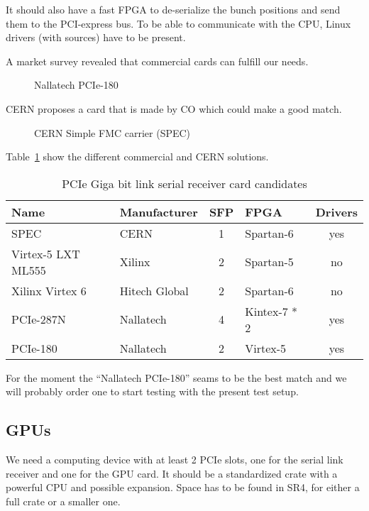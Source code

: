 It should also have a fast FPGA to de-serialize the bunch positions and send them to the PCI-express bus. To be able to communicate with the CPU, Linux drivers (with sources) have to be present.

A market survey revealed that commercial cards can fulfill our needs.

\begin{figure}[H]
\caption{Nallatech PCIe-180}
\label{fig:nallatech}
\centering
\end{figure}

\gls{CERN} proposes a card that is made by \gls{CO} which could make a good match.

\begin{figure}[H]
\caption{CERN Simple FMC carrier (SPEC)}
\label{fig:spec}
\centering
\end{figure}

Table~\ref{tab:receiver_cards} show the different commercial and CERN solutions.

\begin{table}[H]
\caption{PCIe Giga bit link serial receiver card candidates}
\label{tab:receiver_cards}
\centering
\begin{tabular}{|ll|c|l|c|}
\hline
Name & Manufacturer & SFP & FPGA & Drivers \\
\hline
\hline
SPEC & CERN & 1 & Spartan-6 & yes \\
\hline
Virtex-5 LXT ML555 & Xilinx & 2 & Spartan-5 & no \\
\hline
Xilinx Virtex 6 & Hitech Global & 2 & Spartan-6 & no \\
\hline		
PCIe-287N & Nallatech & 4 & Kintex-7 * 2 & yes \\		
PCIe-180 & Nallatech & 2 & Virtex-5 & yes \\
\hline
\end{tabular}
\end{table}

For the moment the ``Nallatech PCIe-180'' seams to be the best match and we will probably order one to start testing with the present test setup.

\subsection{GPUs}

We need a computing device with at least 2 PCIe slots, one for the serial link receiver and one for the \gls{GPU} card. It should be a standardized crate with a powerful \gls{CPU} and possible expansion. Space has to be found in SR4, for either a full crate or a smaller one.

